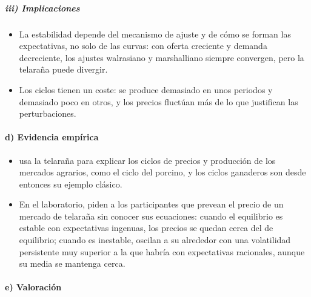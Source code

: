 \documentclass[11pt]{article}
\begin{document}
\subparagraph{iii) Implicaciones}

\begin{itemize}
\item La estabilidad depende del mecanismo de ajuste y de cómo se forman las expectativas, no solo de las curvas: con oferta creciente y demanda decreciente, los ajustes walrasiano y marshalliano siempre convergen, pero la telaraña puede divergir.
\item Los ciclos tienen un coste: se produce demasiado en unos periodos y demasiado poco en otros, y los precios fluctúan más de lo que justifican las perturbaciones.
\end{itemize}

\paragraph{d) Evidencia empírica}

\begin{itemize}
\item \textcite{Ezekiel1938Cobweb} usa la telaraña para explicar los ciclos de precios y producción de los mercados agrarios, como el ciclo del porcino, y los ciclos ganaderos son desde entonces su ejemplo clásico.
\item En el laboratorio, \textcite{HommesEtAl2007Learning} piden a los participantes que prevean el precio de un mercado de telaraña sin conocer sus ecuaciones: cuando el equilibrio es estable con expectativas ingenuas, los precios se quedan cerca del de equilibrio; cuando es inestable, oscilan a su alrededor con una volatilidad persistente muy superior a la que habría con expectativas racionales, aunque su media se mantenga cerca.
\end{itemize}

\paragraph{e) Valoración}
\end{document}
